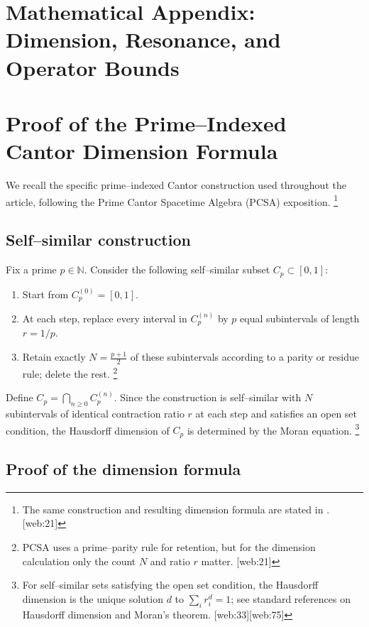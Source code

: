 \documentclass[11pt]{article}
\begin{document}
\appendix
\section*{Mathematical Appendix: Dimension, Resonance, and Operator Bounds}

\section{Proof of the Prime–Indexed Cantor Dimension Formula}

We recall the specific prime–indexed Cantor construction used throughout the article, following the Prime Cantor Spacetime Algebra (PCSA) exposition.%
\footnote{The same construction and resulting dimension formula are stated in \cite{pcsa_gist}. [web:21]} 

\subsection{Self–similar construction}

Fix a prime \(p\in \mathbb{N}\). Consider the following self–similar subset \(C_p \subset [0,1]\):
\begin{enumerate}
  \item Start from \(C_p^{(0)} = [0,1]\).
  \item At each step, replace every interval in \(C_p^{(n)}\) by \(p\) equal subintervals of length \(r = 1/p\).
  \item Retain exactly \(N = \frac{p+1}{2}\) of these subintervals according to a parity or residue rule; delete the rest.%
  \footnote{PCSA uses a prime–parity rule for retention, but for the dimension calculation only the count \(N\) and ratio \(r\) matter. [web:21]} 
\end{enumerate}
Define \(C_p = \bigcap_{n\ge 0} C_p^{(n)}\). Since the construction is self–similar with \(N\) subintervals of identical contraction ratio \(r\) at each step and satisfies an open set condition, the Hausdorff dimension of \(C_p\) is determined by the Moran equation.%
\footnote{For self–similar sets satisfying the open set condition, the Hausdorff dimension is the unique solution \(d\) to \(\sum_i r_i^{d}=1\); see standard references on Hausdorff dimension and Moran's theorem. [web:33][web:75]} 

\subsection{Proof of the dimension formula}
\end{document}
